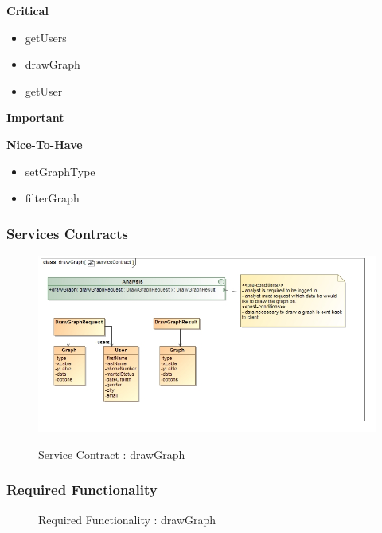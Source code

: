 \documentclass{article}
\begin{document}
		\begin{flushleft}
			\textbf{Critical}
				\begin{itemize}
					\item getUsers
					\item drawGraph
					\item getUser
				\end{itemize}
			\textbf{Important}
				\begin{itemize}
				\end{itemize}

			\textbf{Nice-To-Have}
				\begin{itemize}
					\item setGraphType
					\item filterGraph
				\end{itemize}
		\end{flushleft}

		\subsubsection{Services Contracts}

		\begin{figure}[H]
		\includegraphics[width=\textwidth]{images/class__drawGraph__serviceContract.jpg}  \\
		\caption{Service Contract : drawGraph}
		\end{figure}

		\subsubsection{Required Functionality}

		\begin{figure}[H]
		\caption{Required Functionality : drawGraph}
		\end{figure}
\end{document}
